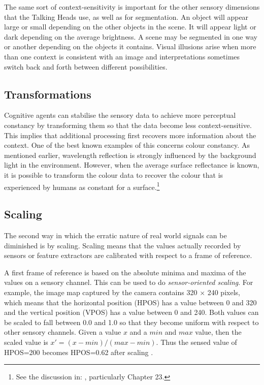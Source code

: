 The same sort of context-sensitivity 
is important for the other sensory dimensions 
that the Talking Heads use, as well as for segmentation. An 
object will appear large or small depending on the 
other objects in the scene. It will appear light 
or dark depending on the average brightness. 
A scene may be segmented in one way or another 
depending on the objects it contains. 
Visual illusions arise when more than one context
is consistent with an image and interpretations sometimes
switch back and forth between different possibilities. 

\subsection{Transformations}

Cognitive agents can stabilise the sensory data to
achieve more perceptual constancy by transforming them so 
that the data become less context-sensitive. 
This implies that additional processing first recovers
more information about the context. 
One of the best known examples of this concerns
colour constancy. As mentioned earlier, wavelength 
reflection is strongly influenced by the background 
light in the environment. However, when the average surface 
reflectance is known, it is possible to transform 
the colour data to recover the colour that is 
experienced by humans as constant for a surface.\footnote{
See the discussion in: \cite{Zeki:1993}, particularly Chapter 
23.}
 
\subsection{Scaling}

The second way in which the erratic nature of 
real world signals can be diminished is by
scaling. Scaling means that 
the values actually recorded by sensors or
feature extractors are calibrated with respect 
to a frame of reference. 

A first frame of reference is based on
the absolute minima and maxima of the values 
on a sensory channel. This can be used to do 
{\itshape sensor-oriented scaling}. For example, 
the image map captured by the camera
contains 320 $\times$ 240 pixels, which means 
that the horizontal position (HPOS) has a value between
0 and 320 and the vertical position (VPOS) has a value 
between 0 and 240. Both values can be scaled to fall between 
0.0 and 1.0 so that they become uniform with respect to 
other sensory channels. Given a value $x$ and a 
$min$ and $max$ value, then the scaled value is 
$x' = {(x - min)}/{(max - min)}$. 
Thus the sensed value of HPOS=200 becomes
HPOS=0.62 after scaling . 

